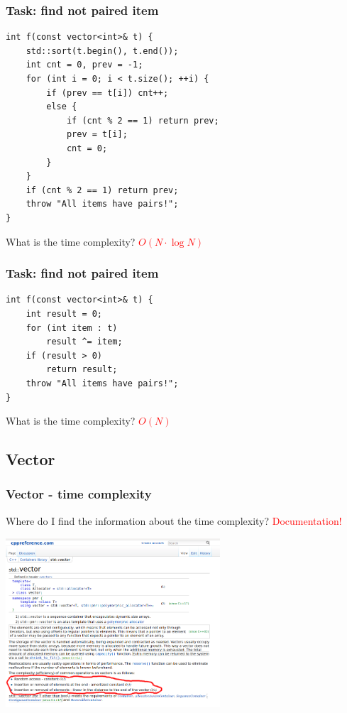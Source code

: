 \documentclass{beamer}
\begin{document}
\begin{frame}[fragile]
    \frametitle{Task: find not paired item}
    \small
    \begin{verbatim}
int f(const vector<int>& t) {
    std::sort(t.begin(), t.end());
    int cnt = 0, prev = -1;
    for (int i = 0; i < t.size(); ++i) {
        if (prev == t[i]) cnt++;
        else {
            if (cnt % 2 == 1) return prev;
            prev = t[i];
            cnt = 0;
        }
    }
    if (cnt % 2 == 1) return prev;
    throw "All items have pairs!";
}\end{verbatim}

    \begin{block}{}
    What is the time complexity? \pause \textcolor{red}{$O(N \cdot \log N)$}
    \end{block}
\end{frame}

\begin{frame}[fragile]
    \frametitle{Task: find not paired item}
    \begin{verbatim}
int f(const vector<int>& t) {
    int result = 0;
    for (int item : t)
        result ^= item;
    if (result > 0)
        return result;
    throw "All items have pairs!";
}\end{verbatim}

    \begin{block}{}
    What is the time complexity? \pause \textcolor{red}{$O(N)$}
    \end{block}
\end{frame}

\subsection{Vector}

\begin{frame}
    \frametitle{Vector - time complexity}
    Where do I find the information about the time complexity?
    \pause
    \textcolor{red}{Documentation!}

    \centering
    \includegraphics[width=8cm]{vector.png}
\end{frame}
\end{document}
